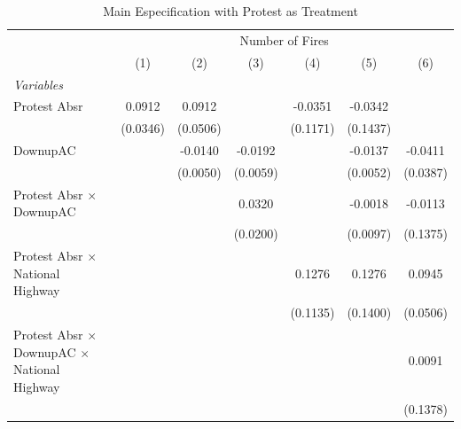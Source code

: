 
\begin{table}[htbp]
   \caption{\label{tab:protest_treat_main} Main Especification with Protest as Treatment}
   \centering
   \begin{tabular}{lcccccc}
      \tabularnewline \midrule \midrule
       & \multicolumn{6}{c}{Number of Fires}\\
                                                                 & (1)           & (2)           & (3)           & (4)           & (5)           & (6)\\  
      \midrule
      \emph{Variables}\\
      Protest Absr                                               & 0.0912        & 0.0912        &               & -0.0351       & -0.0342       &   \\   
                                                                 & (0.0346)      & (0.0506)      &               & (0.1171)      & (0.1437)      &   \\   
      DownupAC                                                   &               & -0.0140       & -0.0192       &               & -0.0137       & -0.0411\\   
                                                                 &               & (0.0050)      & (0.0059)      &               & (0.0052)      & (0.0387)\\   
      Protest Absr $\times$ DownupAC                             &               &               & 0.0320        &               & -0.0018       & -0.0113\\   
                                                                 &               &               & (0.0200)      &               & (0.0097)      & (0.1375)\\   
      Protest Absr $\times$ National Highway                     &               &               &               & 0.1276        & 0.1276        & 0.0945\\   
                                                                 &               &               &               & (0.1135)      & (0.1400)      & (0.0506)\\   
      Protest Absr $\times$ DownupAC $\times$ National Highway   &               &               &               &               &               & 0.0091\\   
                                                                 &               &               &               &               &               & (0.1378)\\   

\end{tabular}
\end{table}
